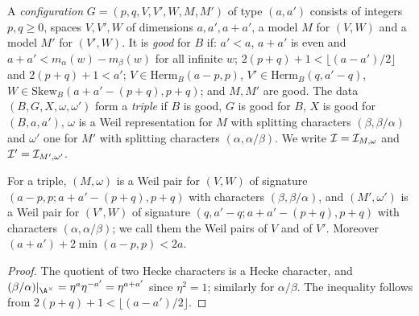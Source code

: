 \begin{definition}\label{pf:thmK:def:geo}
A \emph{configuration} $G=(p,q,V,V',W,M,M')$ of type $(a,a')$ consists of integers $p,q\ge0$, spaces $V,V',W$ of
dimensions $a,a',a+a'$, a model $M$ for $(V,W)$ and a model $M'$ for $(V',W)$. It is \emph{good} for $B$ if: $a'<a$,
$a+a'$ is even and $a+a'<m_\alpha(w)-m_\beta(w)$ for all infinite $w$; $2(p+q)+1<\lfloor(a-a')/2\rfloor$ and
$2(p+q)+1<a'$; $V\in\mathrm{Herm}_B(a-p,p)$, $V'\in\mathrm{Herm}_B(q,a'-q)$, $W\in\mathrm{Skew}_B(a+a'-(p+q),p+q)$;
and $M,M'$ are good. The data $(B,G,X,\omega,\omega')$ form a \emph{triple} if $B$ is good, $G$ is good for $B$, $X$ is
good for $(B,a,a')$, $\omega$ is a Weil representation for $M$ with splitting characters $(\beta,\beta/\alpha)$ and
$\omega'$ one for $M'$ with splitting characters $(\alpha,\alpha/\beta)$. We write $\mathcal{I}=\mathcal{I}_{M,\omega}$ and
$\mathcal{I}'=\mathcal{I}_{M',\omega'}$.
\end{definition}

\begin{lemma}\label{pf:thmK:pairs}
For a triple, $(M,\omega)$ is a Weil pair for $(V,W)$ of signature $(a-p,p;a+a'-(p+q),p+q)$ with characters
$(\beta,\beta/\alpha)$, and $(M',\omega')$ is a Weil pair for $(V',W)$ of signature $(q,a'-q;a+a'-(p+q),p+q)$ with
characters $(\alpha,\alpha/\beta)$; we call them the Weil pairs of $V$ and of $V'$. Moreover $(a+a')+2\min(a-p,p)<2a$.
\end{lemma}

\begin{proof}
The quotient of two Hecke characters is a Hecke character, and $(\beta/\alpha)|_{\A^\times}=\eta^{a}\eta^{-a'}=\eta^{a+a'}$
since $\eta^2=1$; similarly for $\alpha/\beta$. The inequality follows from $2(p+q)+1<\lfloor(a-a')/2\rfloor$.
\end{proof}

